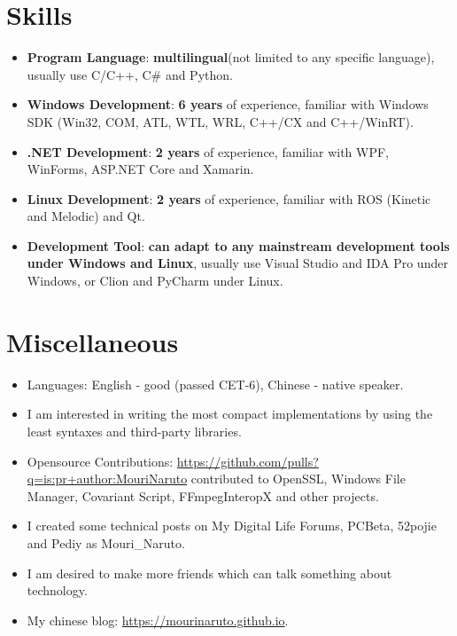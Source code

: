 \documentclass{resume}
\begin{document}
\section{Skills}
\begin{itemize}

  \item \textbf{Program Language}:
    \textbf{multilingual}(not limited to any specific language), usually use C/C++, C\# and Python.

  \item \textbf{Windows Development}:
    \textbf{6 years} of experience, familiar with Windows SDK (Win32, COM, ATL, WTL, WRL, C++/CX and C++/WinRT).

  \item \textbf{.NET Development}:
    \textbf{2 years} of experience, familiar with WPF, WinForms, ASP.NET Core and Xamarin.
  
  \item \textbf{Linux Development}:
    \textbf{2 years} of experience, familiar with ROS (Kinetic and Melodic) and Qt.

  \item \textbf{Development Tool}:
    \textbf{can adapt to any mainstream development tools under Windows and Linux}, usually use Visual Studio and IDA Pro under Windows, or Clion and PyCharm under Linux.

\end{itemize}

\section{Miscellaneous}
\begin{itemize}

  \item Languages: English - good (passed CET-6),  Chinese - native speaker.

  \item I am interested in writing the most compact implementations by using the least syntaxes and third-party libraries.

  \item Opensource Contributions: \href{https://github.com/pulls?q=is:pr+author:MouriNaruto}{https://github.com/pulls?q=is:pr+author:MouriNaruto} contributed to OpenSSL, Windows File Manager, Covariant Script, FFmpegInteropX and other projects.
  
  \item I created some technical posts on My Digital Life Forums, PCBeta, 52pojie and Pediy as Mouri\_Naruto.
  
  \item I am desired to make more friends which can talk something about technology.

  \item My chinese blog: \href{https://mourinaruto.github.io}{https://mourinaruto.github.io}.
  
\end{itemize}
\end{document}
